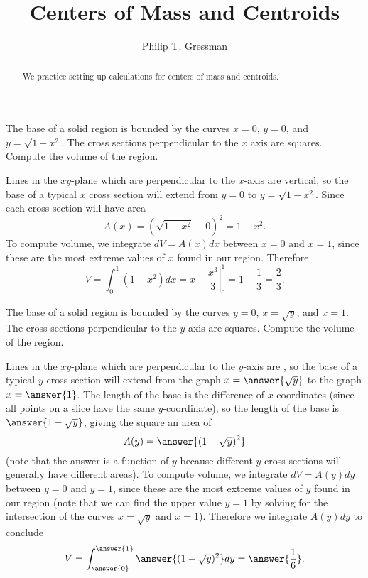 \documentclass{ximera}
\title{Centers of Mass and Centroids}
\author{Philip T. Gressman}
\begin{document}
\begin{abstract}
We practice setting up calculations for centers of mass and centroids.
\end{abstract}
\maketitle

\begin{example}
The base of a solid region is bounded by the curves $x = 0$, $y= 0$, and $y = \sqrt{1-x^2}$. The cross sections perpendicular to the $x$ axis are squares. Compute the volume of the region.
\begin{solution}
Lines in the $xy$-plane which are perpendicular to the $x$-axis are vertical, so the base of a typical $x$ cross section will extend from $y=0$ to $y = \sqrt{1-x^2}$. Since each cross section will have area
\[ A(x) = \left( \sqrt{1-x^2} - 0 \right)^2 = 1-x^2. \]
To compute volume, we integrate $dV = A(x) dx$ between $x=0$ and $x=1$, since these are the most extreme values of $x$ found in our region. Therefore
\[ V = \int_0^1 ( 1 -x^2) dx = \left. x - \frac{x^3}{3} \right|_0^1 = 1 - \frac{1}{3} = \frac{2}{3}. \]
\end{solution}
\end{example}

\begin{example}
The base of a solid region is bounded by the curves $y = 0$, $x = \sqrt{y}$, and $x = 1$. The cross sections perpendicular to the $y$-axis are squares. Compute the volume of the region.
\begin{solution}
Lines in the $xy$-plane which are perpendicular to the $y$-axis are , so the base of a typical $y$ cross section will extend from the graph $x=\answer{\sqrt{y}}$ to the graph $x = \answer{1}$. The length of the base is the difference of $x$-coordinates (since all points on a slice have the same $y$-coordinate), so the length of the base is $\answer{1 - \sqrt{y}}$, giving the square an area of 
\[ A(y) = \answer{(1-\sqrt{y})^2} \]
(note that the answer is a function of $y$ because different $y$ cross sections will generally have different areas).
To compute volume, we integrate $dV = A(y) dy$ between $y=0$ and $y=1$, since these are the most extreme values of $y$ found in our region (note that we can find the upper value $y=1$ by solving for the intersection of the curves $x = \sqrt{y}$ and $x=1$). Therefore we integrate $A(y) dy$ to conclude
\[ V = \int_{\answer{0}}^{\answer{1}} \answer{(1-\sqrt{y})^2} dy = \answer{\frac{1}{6}}. \]
\end{solution}
\end{example}
\end{document}
